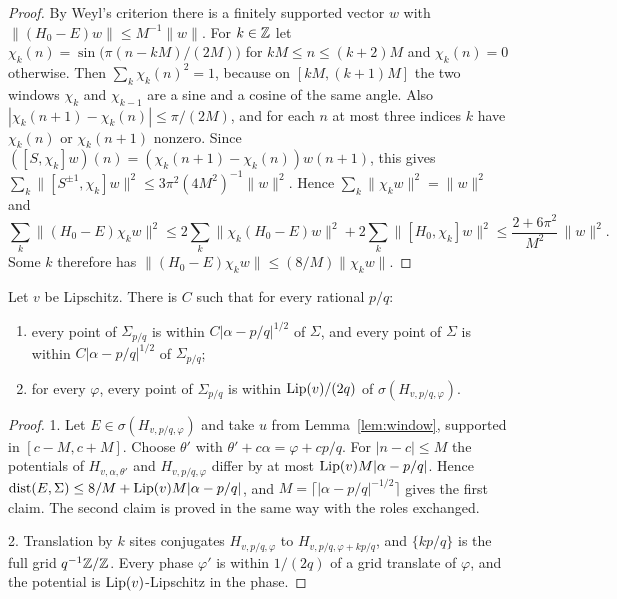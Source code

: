 \begin{proof}
By Weyl's criterion there is a finitely supported vector $w$ with $\|(H_0-E)w\|\le M^{-1}\|w\|$. For $k\in\mathbb Z$ let $\chi_k(n)=\sin\bigl(\pi(n-kM)/(2M)\bigr)$ for $kM\le n\le (k+2)M$ and $\chi_k(n)=0$ otherwise. Then $\sum_k\chi_k(n)^2=1$, because on $[kM,(k+1)M]$ the two windows $\chi_k$ and $\chi_{k-1}$ are a sine and a cosine of the same angle. Also $|\chi_k(n+1)-\chi_k(n)|\le\pi/(2M)$, and for each $n$ at most three indices $k$ have $\chi_k(n)$ or $\chi_k(n+1)$ nonzero. Since $([S,\chi_k]w)(n)=(\chi_k(n+1)-\chi_k(n))w(n+1)$, this gives $\sum_k\|[S^{\pm1},\chi_k]w\|^2\le 3\pi^2(4M^2)^{-1}\|w\|^2$. Hence $\sum_k\|\chi_kw\|^2=\|w\|^2$ and
\[
\sum_k\|(H_0-E)\chi_kw\|^2\le2\sum_k\|\chi_k(H_0-E)w\|^2+2\sum_k\|[H_0,\chi_k]w\|^2\le\frac{2+6\pi^2}{M^2}\,\|w\|^2.
\]
Some $k$ therefore has $\|(H_0-E)\chi_kw\|\le (8/M)\|\chi_kw\|$.
\end{proof}

\begin{lemma}\label{lem:ratspec}
Let $v$ be Lipschitz. There is $C$ such that for every rational $p/q$:
\begin{enumerate}
\item every point of $\Sigma_{p/q}$ is within $C|\alpha-p/q|^{1/2}$ of $\Sigma$, and every point of $\Sigma$ is within $C|\alpha-p/q|^{1/2}$ of $\Sigma_{p/q}$;
\item for every $\varphi$, every point of $\Sigma_{p/q}$ is within $\operatorname{Lip}(v)/(2q)$ of $\sigma(H_{v,p/q,\varphi})$.
\end{enumerate}
\end{lemma}

\begin{proof}
1. Let $E\in\sigma(H_{v,p/q,\varphi})$ and take $u$ from Lemma~\ref{lem:window}, supported in $[c-M,c+M]$. Choose $\theta'$ with $\theta'+c\alpha=\varphi+cp/q$. For $|n-c|\le M$ the potentials of $H_{v,\alpha,\theta'}$ and $H_{v,p/q,\varphi}$ differ by at most $\operatorname{Lip}(v)M|\alpha-p/q|$. Hence $\operatorname{dist}(E,\Sigma)\le 8/M+\operatorname{Lip}(v)M|\alpha-p/q|$, and $M=\lceil|\alpha-p/q|^{-1/2}\rceil$ gives the first claim. The second claim is proved in the same way with the roles exchanged.

2. Translation by $k$ sites conjugates $H_{v,p/q,\varphi}$ to $H_{v,p/q,\varphi+kp/q}$, and $\{kp/q\}$ is the full grid $q^{-1}\mathbb Z/\mathbb Z$. Every phase $\varphi'$ is within $1/(2q)$ of a grid translate of $\varphi$, and the potential is $\operatorname{Lip}(v)$-Lipschitz in the phase.
\end{proof}

